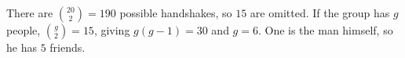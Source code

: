 There are $\binom{20}{2}=190$ possible handshakes, so $15$ are omitted. If the group has $g$ people, $\binom g2=15$, giving $g(g-1)=30$ and $g=6$. One is the man himself, so he has $\boxed5$ friends.
